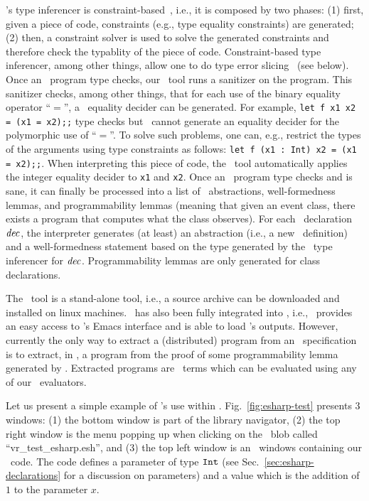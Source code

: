 \documentclass[final]{article}
\begin{document}
\eml's type inferencer is
constraint-based~\cite{Odersky+Sulzmann+Wehr:1999,Pottier:2005,Pottier+Remy:2005},
i.e., it is composed by two phases: (1) first, given a piece of code,
constraints (e.g., type equality constraints) are generated; (2) then,
a constraint solver is used to solve the generated constraints and
therefore check the typablity of the piece of code.  Constraint-based
type inferencer, among other things, allow one to do type error
slicing~\cite{Haack+Wells:2003,Haack+Wells:2004,Rahli:2011} (see
below).  Once an \eml\ program type checks, our \eml\ tool runs a
sanitizer on the program.  This sanitizer checks, among other things,
that for each use of the binary equality operator ``$=$'', a
\nuprl\ equality decider can be generated.  For example,
\lstinline{let f x1 x2 = (x1 = x2);;} type checks but \eml\ cannot
generate an equality decider for the polymorphic use of ``$=$''.
To solve such problems, one can, e.g., restrict the types of the
arguments using type constraints as follows:
\lstinline{let f (x1 : Int) x2 = (x1 = x2);;}.
When interpreting this piece of code, the \eml\ tool automatically
applies the integer equality
decider to \lstinline{x1} and \lstinline{x2}.
%
Once an \eml\ program type checks and is sane, it can finally be
processed into a list of \nuprl\ abstractions, well-formedness lemmas,
and programmability lemmas (meaning that given an event class, there
exists a program that computes what the class observes).  For each
\eml\ declaration $\mathit{dec}$, the interpreter generates (at least) an
abstraction (i.e., a new \nuprl\ definition) and a well-formedness
statement based on the type generated by the \eml\ type inferencer for
$\mathit{dec}$.  Programmability lemmas are only generated for class
declarations.

The \eml\ tool is a stand-alone tool, i.e., a source archive can be
downloaded and installed on linux machines.  \eml\ has also been fully
integrated into \nuprl, i.e., \nuprl\ provides an easy access to
\eml's Emacs interface and is able to load \eml's outputs.  However,
currently the only way to extract a (distributed) program from an
\eml\ specification is to extract, in \nuprl, a program from the proof
of some programmability lemma generated by \eml.  Extracted programs
are \nuprl\ terms which can be evaluated using any of our
\ML\ evaluators.

Let us present a simple example of \eml's use within \nuprl.
Fig.~\ref{fig:esharp-test} presents 3 windows: (1) the bottom window
is part of the library navigator, (2) the top right window is the menu
popping up when clicking on the \eml\ blob called
``vr\_test\_esharp.esh'', and (3) the top left window is an
\emacs\ windows containing our \eml\ code.  The code defines a
parameter of type $\mathtt{Int}$ (see Sec.~\ref{sec:esharp-declarations}
for a discussion on parameters) and a value which is the addition of
$1$ to the parameter $x$.
\end{document}
